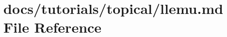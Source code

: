 \hypertarget{llemu_8md}{}\section{docs/tutorials/topical/llemu.md File Reference}
\label{llemu_8md}
